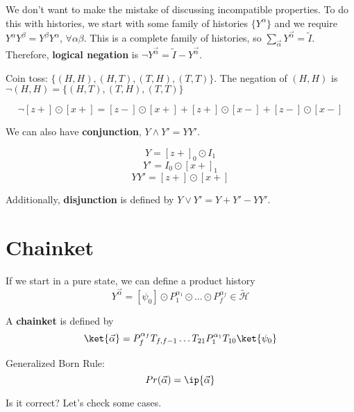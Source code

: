 \documentclass[a4paper,twoside,master.tex]{subfiles}
\begin{document}
We don't want to make the mistake of discussing incompatible properties. To do this with histories, we start with some family of histories $\{Y^\alpha\} $ and we require $Y^\alpha Y^\beta = Y^\beta Y^\alpha$, $\forall\alpha\beta$. This is a complete family of histories, so $\sum_{\vec{\alpha}} Y^{\vec{\alpha}} = \tilde{I}$. Therefore, \textbf{logical negation} is $\neg Y^{\vec{\alpha}} = \tilde{I}-Y^{\vec{\alpha}}$.
\begin{ex}
    Coin toss: $\{(H,H), (H,T), (T,H), (T,T)\} $. The negation of $(H,H)$ is $\neg(H,H) = \{(H,T),(T,H),(T,T)\} $
\end{ex}
\begin{ex}
    \begin{equation}
        \neg [z+] \odot [x+] = [z-]\odot [x+] + [z+]\odot [x-] + [z-]\odot [x-]
    \end{equation}
\end{ex}
We can also have \textbf{conjunction}, $Y \wedge Y' = YY'$.
\begin{ex}
    \begin{equation}
        Y=[z+]_0\odot I_1
    \end{equation}
    \begin{equation}
        Y' = I_0\odot [x+]_1
    \end{equation}
    \begin{equation}
        YY' = [z+]\odot [x+]
    \end{equation}
\end{ex}
Additionally, \textbf{disjunction} is defined by $Y\vee Y' = Y+Y' - YY'$.

\section{Chainket}%
\label{sec:chainket_}

If we start in a pure state, we can define a product history
\begin{equation}
    Y^{\vec{\alpha}} = [\psi_0]\odot P_1^{\alpha_1}\odot\ldots\odot P_f^{\alpha_f}\in\tilde{\mathcal{H}}
\end{equation}
\begin{definition}
    A \textbf{chainket} is defined by
    \begin{equation}
        \ket{\vec{\alpha}} =P_f^{\alpha_f} T_{f,f-1}\ldots T_{21}P_1^{\alpha_1}T_{10}\ket{\psi_0}
    \end{equation}
\end{definition}
\begin{theorem}
    Generalized Born Rule:
    \begin{equation}
        Pr(\vec{\alpha}) = \ip{\vec{\alpha}}
    \end{equation}
\end{theorem}
Is it correct? Let's check some cases.
\end{document}
